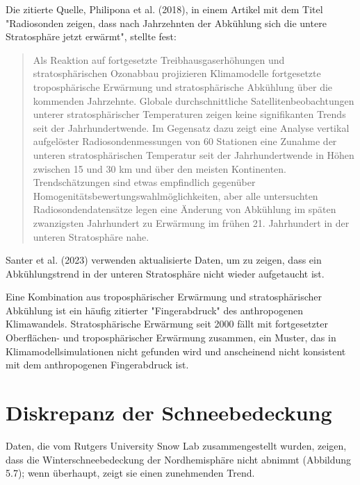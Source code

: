\documentclass[12pt,paper=a4,DIV=12,parskip=never,chapterprefix=false,headings=standardclasses]{scrreprt}
\begin{document}
Die zitierte Quelle, Philipona et al. (2018), in einem Artikel mit dem Titel "Radiosonden zeigen, dass nach Jahrzehnten der Abkühlung sich die untere Stratosphäre jetzt erwärmt", stellte fest:
\begin{quote}
Als Reaktion auf fortgesetzte Treibhausgaserhöhungen und stratosphärischen Ozonabbau projizieren Klimamodelle fortgesetzte troposphärische Erwärmung und stratosphärische Abkühlung über die kommenden Jahrzehnte. Globale durchschnittliche Satellitenbeobachtungen unterer stratosphärischer Temperaturen zeigen keine signifikanten Trends seit der Jahrhundertwende. Im Gegensatz dazu zeigt eine Analyse vertikal aufgelöster Radiosondenmessungen von 60 Stationen eine Zunahme der unteren stratosphärischen Temperatur seit der Jahrhundertwende in Höhen zwischen 15 und 30 km und über den meisten Kontinenten. Trendschätzungen sind etwas empfindlich gegenüber Homogenitätsbewertungswahlmöglichkeiten, aber alle untersuchten Radiosondendatensätze legen eine Änderung von Abkühlung im späten zwanzigsten Jahrhundert zu Erwärmung im frühen 21. Jahrhundert in der unteren Stratosphäre nahe.
\end{quote}

Santer et al. (2023) verwenden aktualisierte Daten, um zu zeigen, dass ein Abkühlungstrend in der unteren Stratosphäre nicht wieder aufgetaucht ist.

Eine Kombination aus troposphärischer Erwärmung und stratosphärischer Abkühlung ist ein häufig zitierter "Fingerabdruck" des anthropogenen Klimawandels. Stratosphärische Erwärmung seit 2000 fällt mit fortgesetzter Oberflächen- und troposphärischer Erwärmung zusammen, ein Muster, das in Klimamodellsimulationen nicht gefunden wird und anscheinend nicht konsistent mit dem anthropogenen Fingerabdruck ist.

\section{Diskrepanz der Schneebedeckung}
Daten, die vom Rutgers University Snow Lab zusammengestellt wurden, zeigen, dass die Winterschneebedeckung der Nordhemisphäre nicht abnimmt (Abbildung 5.7); wenn überhaupt, zeigt sie einen zunehmenden Trend.
\end{document}
